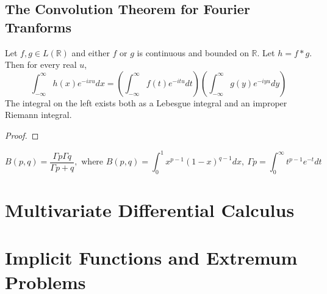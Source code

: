 \section{The Convolution Theorem for Fourier Tranforms}
\begin{theorem}
	Let $f,g \in L(\mathbb{R})$ and either $f$ or $g$ is continuous and bounded on $\mathbb{R}$. Let $h = f \ast g$. Then for every real $u$,
	$$ \int_{-\infty}^\infty h(x) e^{-ixu} dx = \left( \int_{-\infty}^\infty f(t) e^{-itu} dt \right) \left( \int_{-\infty}^\infty g(y) e^{-iyu} dy \right)$$
	The integral on the left exists both as a Lebesgue integral and an improper Riemann integral.
\end{theorem}
\begin{synopsis}
\end{synopsis}
\begin{proof}
\end{proof}

\begin{remark}
	$$B(p,q) = \frac{\Gamma{p} \Gamma{q}}{\Gamma{p+q}},\text{ where } B(p,q) = \int_0^1 x^{p-1} (1-x)^{q-1} dx,\ \Gamma{p} = \int_0^\infty t^{p-1} e^{-t} dt$$
\end{remark}
\chapter{Multivariate Differential Calculus}
\chapter{Implicit Functions and Extremum Problems}


